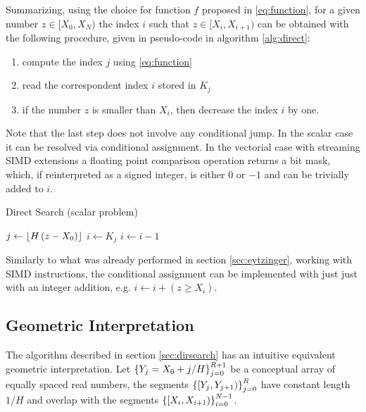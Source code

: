 \documentclass[preprint,1p,times]{elsarticle}
\begin{document}
Summarizing, using the choice for function $f$ proposed in \eqref{eq:function}, for a given number $z\in [X_0,X_N)$ the index $i$ such that $z\in [X_i,X_{i+1})$ can be obtained with the following procedure, given in pseudo-code in algorithm \ref{alg:direct}:
\begin{enumerate}
	\item compute the index $j$ using \eqref{eq:function}
	\item read the correspondent index $i$ stored in $K_j$
	\item if the number $z$ is smaller than $X_i$, then decrease the index $i$ by one.
\end{enumerate}
Note that the last step does not involve any conditional jump. In the scalar case it can be resolved via conditional assignment. In the vectorial case with streaming SIMD extensions a floating point comparison operation returns a bit mask, which, if reinterpreted as a signed integer, is either $0$ or $-1$ and can be trivially added to $i$.

\begin{algorithm}
	\caption{Direct Search (scalar problem)}
	\label{alg:direct}
	\begin{algorithmic}
		\State $j \leftarrow \left \lfloor  H \, (z-X_0)  \right \rfloor$
		\State $i \leftarrow K_j$
			\State $i \leftarrow i-1$ 
		\EndIf
		\EndFunction
	\end{algorithmic}
\end{algorithm}

Similarly to what was already performed in section \ref{sec:eytzinger}, working with SIMD instructions, the conditional assignment can be implemented with just just with an integer addition, e.g. $i \leftarrow i + (z \geq X_i)$.

\subsection{Geometric Interpretation}
\label{sec:geometric}

The algorithm described in section \eqref{sec:dirsearch} has an intuitive equivalent geometric interpretation.
Let $\left \{ Y_j=X_0+j/H \right \}_{j=0}^{R+1}$ be a conceptual array of equally spaced real numbers, the segments $\left \{ [Y_{j},Y_{j+1}) \right \}_{j=0}^{R}$ have constant length $1/H$ and overlap with the segments $\left \{ [X_{i},X_{i+1}) \right \}_{i=0}^{N-1}$.
\end{document}
